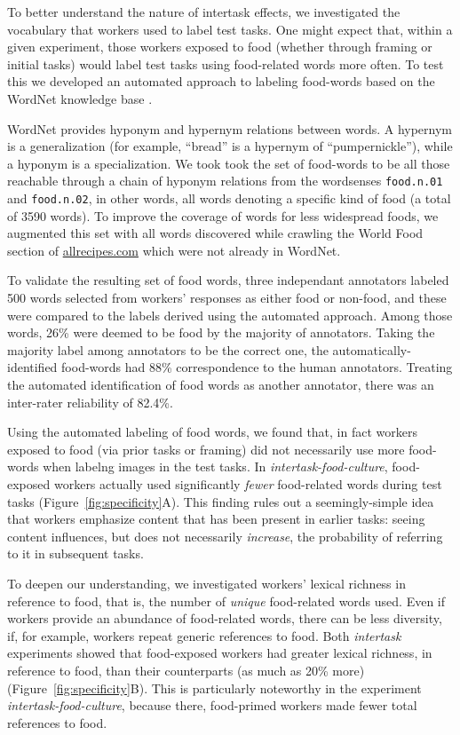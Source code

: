 \documentclass{sigchi}
\begin{document}
To better understand the nature of 
intertask effects, we investigated the vocabulary
that workers used to label test tasks. One might expect that, within a given 
experiment, those workers exposed to food (whether through framing or initial
tasks) would label test tasks using 
food-related words more often.  To test this we developed an 
automated approach to labeling food-words based on the 
WordNet knowledge base \cite{felbaum1998wordnet}.  

WordNet provides
hyponym and hypernym relations between words.  A hypernym is a 
generalization (for example, ``bread'' is a hypernym of ``pumpernickle''), 
while a hyponym is a specialization.  We took took the set of food-words
to be all those reachable through
a chain of hyponym relations from the wordsenses 
\texttt{food.n.01} and \texttt{food.n.02}, in other words, all words
denoting a specific kind of food (a total of 3590 words).  
To improve the coverage of words for
less widespread foods, we augmented this set with all words
discovered while crawling the World Food section of \url{allrecipes.com} 
which were not already in WordNet.  

To validate the resulting set of 
food words, three independant annotators labeled 500 words selected from 
workers' responses as either food or non-food, and these were
compared to the labels derived using the automated approach.
Among those words, 26\% were 
deemed to be food by the majority of annotators.  
Taking the majority label among annotators to be the correct one, 
the automatically-identified food-words
had 88\% correspondence to the human annotators.  Treating the
automated identification of food words as another annotator, there 
was an inter-rater reliability of 82.4\%.

Using the automated labeling of food words, we found that, in fact
workers exposed to food (via prior tasks or framing) did not necessarily
use more food-words when labelng images in the test tasks.
In \textit{intertask-food-culture}, food-exposed
workers actually used significantly \textit{fewer} food-related words 
during test tasks (Figure~\ref{fig:specificity}A).  This finding
rules out a seemingly-simple idea that workers emphasize
content that has been present in earlier tasks: seeing content 
influences, but does not necessarily \textit{increase}, the probability of 
referring to it in subsequent tasks.

To deepen our understanding, we investigated workers' lexical richness in 
reference to food, that is, the number of \textit{unique} food-related words
used.  Even if workers provide an abundance of food-related words, there
can be less diversity, if, for example, workers repeat generic references 
to food.
Both \textit{intertask} experiments showed that food-exposed workers had 
greater lexical richness, in reference to food, than their counterparts 
(as much as 20\% more) (Figure~\ref{fig:specificity}B).  
This is particularly noteworthy in the experiment
\textit{intertask-food-culture}, because there,
food-primed workers made fewer total references to food.  
\end{document}
